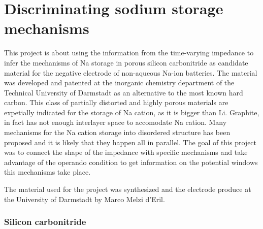\chapter{Discriminating sodium storage mechanisms}

This project is about using the information from the time-varying impedance to infer the mechanisms of Na storage in porous silicon carbonitride as candidate material for the negative electrode of non-aqueous Na-ion batteries. The material was developed and patented at the inorganic chemistry department of the Technical University of Darmstadt as an alternative to the most known hard carbon. This class of partially distorted and highly porous materials are expetially indicated for the storage of Na cation, as it is bigger than Li. Graphite, in fact has not enough interlayer space to accomodate Na cation. Many mechanisms for the Na cation storage into disordered structure has been proposed and it is likely that they happen all in parallel. The goal of this project was to connect the shape of the impedance with specific mechanisms and take advantage of the operando condition to get information on the potential windows this mechanisms take place. 

The material used for the project was synthesized and the electrode produce at the University of Darmstadt by Marco Melzi d’Eril.

\subsection{Silicon carbonitride}

